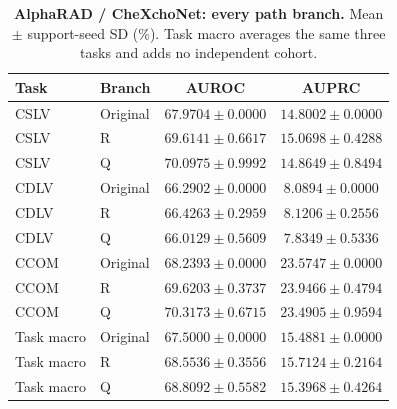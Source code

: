 \begin{table}[tp]
\centering
\caption{\textbf{AlphaRAD / CheXchoNet: every path branch.} Mean $\pm$ support-seed SD (\%). Task macro averages the same three tasks and adds no independent cohort.}
\label{tab:supp-cardiac-path-alpharad}
\small
\setlength{\tabcolsep}{4pt}
\begin{tabular*}{\textwidth}{@{\extracolsep{\fill}}llcc@{}}
\toprule
Task & Branch & AUROC & AUPRC \\
\midrule
CSLV & Original & $67.9704\pm0.0000$ & $14.8002\pm0.0000$ \\
CSLV & R & $69.6141\pm0.6617$ & $15.0698\pm0.4288$ \\
CSLV & Q & $70.0975\pm0.9992$ & $14.8649\pm0.8494$ \\
CDLV & Original & $66.2902\pm0.0000$ & $8.0894\pm0.0000$ \\
CDLV & R & $66.4263\pm0.2959$ & $8.1206\pm0.2556$ \\
CDLV & Q & $66.0129\pm0.5609$ & $7.8349\pm0.5336$ \\
CCOM & Original & $68.2393\pm0.0000$ & $23.5747\pm0.0000$ \\
CCOM & R & $69.6203\pm0.3737$ & $23.9466\pm0.4794$ \\
CCOM & Q & $70.3173\pm0.6715$ & $23.4905\pm0.9594$ \\
Task macro & Original & $67.5000\pm0.0000$ & $15.4881\pm0.0000$ \\
Task macro & R & $68.5536\pm0.3556$ & $15.7124\pm0.2164$ \\
Task macro & Q & $68.8092\pm0.5582$ & $15.3968\pm0.4264$ \\
\bottomrule
\end{tabular*}
\end{table}

